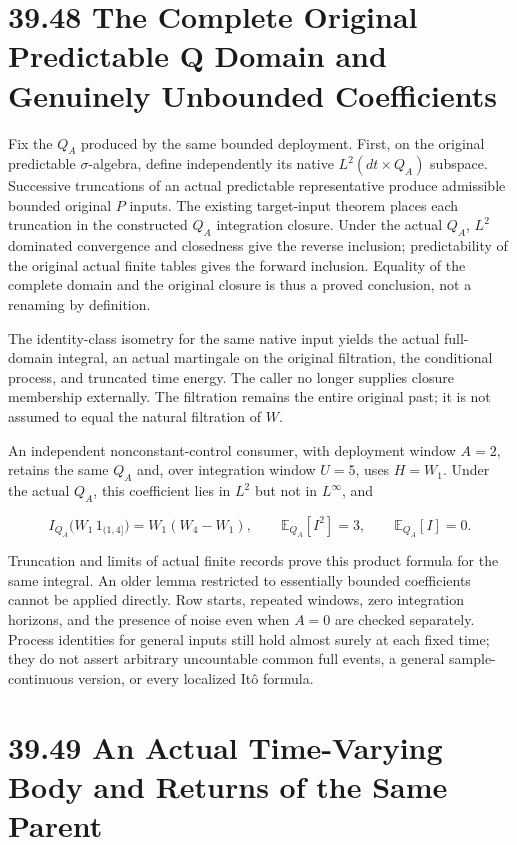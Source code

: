 \documentclass[
  english,
  11pt,
  oneside]{book}
\begin{document}
\section{39.48 The Complete Original Predictable Q Domain and Genuinely Unbounded Coefficients}\label{the-complete-original-predictable-q-domain-and-genuinely-unbounded-coefficients}

Fix the \(Q_A\) produced by the same bounded deployment. First, on the original predictable \(\sigma\)-algebra, define independently its native \(L^2(dt\times Q_A)\) subspace. Successive truncations of an actual predictable representative produce admissible bounded original \(P\) inputs. The existing target-input theorem places each truncation in the constructed \(Q_A\) integration closure. Under the actual \(Q_A\), \(L^2\) dominated convergence and closedness give the reverse inclusion; predictability of the original actual finite tables gives the forward inclusion. Equality of the complete domain and the original closure is thus a proved conclusion, not a renaming by definition.

The identity-class isometry for the same native input yields the actual full-domain integral, an actual martingale on the original filtration, the conditional process, and truncated time energy. The caller no longer supplies closure membership externally. The filtration remains the entire original past; it is not assumed to equal the natural filtration of \(W\).

An independent nonconstant-control consumer, with deployment window \(A=2\), retains the same \(Q_A\) and, over integration window \(U=5\), uses \(H=W_1\). Under the actual \(Q_A\), this coefficient lies in \(L^2\) but not in \(L^\infty\), and

\[I_{Q_A}\bigl(W_1\,1_{(1,4]}\bigr)=W_1(W_4-W_1),
\qquad \mathbb E_{Q_A}[I^2]=3,\qquad\mathbb E_{Q_A}[I]=0.\]

Truncation and limits of actual finite records prove this product formula for the same integral. An older lemma restricted to essentially bounded coefficients cannot be applied directly. Row starts, repeated windows, zero integration horizons, and the presence of noise even when \(A=0\) are checked separately. Process identities for general inputs still hold almost surely at each fixed time; they do not assert arbitrary uncountable common full events, a general sample-continuous version, or every localized Itô formula.

\section{39.49 An Actual Time-Varying Body and Returns of the Same Parent}\label{an-actual-time-varying-body-and-returns-of-the-same-parent}
\end{document}
